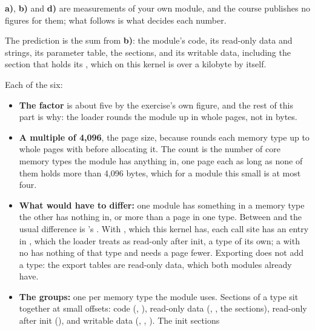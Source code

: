 
\textbf{a)}, \textbf{b)} and \textbf{d)} are measurements of your own module, and the course
publishes no figures for them; what follows is what decides each number.

 The prediction is the sum from \textbf{b)}: the module's code, its read-only data and
strings, its parameter table, the  sections, and its writable data, including the
 section that holds its , which on this kernel is
over a kilobyte by itself.

 Each of the six:
\begin{itemize}
  \item \textbf{The factor} is about five by the exercise's own figure, and the rest of this part is
    why: the loader rounds the module up in whole pages, not in bytes.
  \item \textbf{A multiple of 4,096}, the page size, because  rounds each
    memory type up to whole pages with  before allocating it. The count is the
    number of core memory types the module has anything in, one page each as long as none of them
    holds more than 4,096 bytes, which for a module this small is at most four.
  \item \textbf{What would have to differ:} one module has something in a memory type the other has
    nothing in, or more than a page in one type. Between  and  the
    usual difference is 's . With , which this
    kernel has, each  call site has an entry in , which the loader
    treats as read-only after init, a type of its own; a  with no 
    has nothing of that type and needs a page fewer. Exporting does not add a type: the export
    tables are read-only data, which both modules already have.
  \item \textbf{The groups:} one per memory type the module uses. Sections of a type sit together at
    small offsets: code (, ), read-only data (,
    , the  sections), read-only after init (), and
    writable data (, , ). The init sections

\end{itemize}

